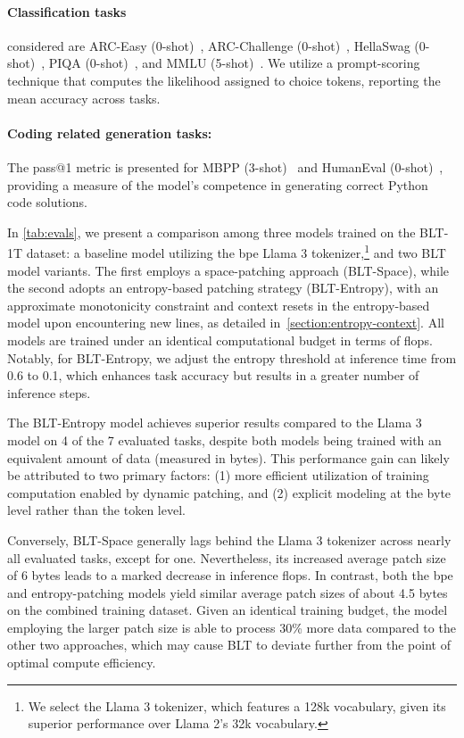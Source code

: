\paragraph{Classification tasks} considered are ARC-Easy (0-shot)~\citep{Eval_ARC}, ARC-Challenge (0-shot)~\citep{Eval_ARC}, HellaSwag (0-shot)~\citep{Eval_hellaswag}, PIQA (0-shot)~\citep{Eval_piqa}, and MMLU (5-shot)~\citep{hendrycks2020measuring}. We utilize a prompt-scoring technique that computes the likelihood assigned to choice tokens, reporting the mean accuracy across tasks.
\paragraph{Coding related generation tasks:}  The pass@1 metric is presented for MBPP (3-shot)~\citep{Eval_MBPP} and HumanEval (0-shot)~\citep{Eval_HumanEval}, providing a measure of the model's competence in generating correct Python code solutions.

In \autoref{tab:evals}, we present a comparison among three models trained on the {\textsc BLT}-1T dataset: a baseline model utilizing the bpe Llama 3 tokenizer,\footnote{We select the Llama 3 tokenizer, which features a 128k vocabulary, given its superior performance over Llama 2's 32k vocabulary.} and two {\textsc BLT} model variants. The first employs a space-patching approach ({\textsc BLT}-Space), while the second adopts an entropy-based patching strategy ({\textsc BLT}-Entropy), with an approximate monotonicity constraint and context resets in the entropy-based model upon encountering new lines, as detailed in~\autoref{section:entropy-context}. All models are trained under an identical computational budget in terms of flops. Notably, for {\textsc BLT}-Entropy, we adjust the entropy threshold at inference time from 0.6 to 0.1, which enhances task accuracy but results in a greater number of inference steps.

The {\textsc BLT}-Entropy model achieves superior results compared to the Llama 3 model on 4 of the 7 evaluated tasks, despite both models being trained with an equivalent amount of data (measured in bytes). This performance gain can likely be attributed to two primary factors: (1) more efficient utilization of training computation enabled by dynamic patching, and (2) explicit modeling at the byte level rather than the token level.

Conversely, {\textsc BLT}-Space generally lags behind the Llama 3 tokenizer across nearly all evaluated tasks, except for one. Nevertheless, its increased average patch size of 6 bytes leads to a marked decrease in inference flops. In contrast, both the bpe and entropy-patching models yield similar average patch sizes of about 4.5 bytes on the combined training dataset. Given an identical training budget, the model employing the larger patch size is able to process 30\% more data compared to the other two approaches, which may cause {\textsc BLT} to deviate further from the point of optimal compute efficiency.


